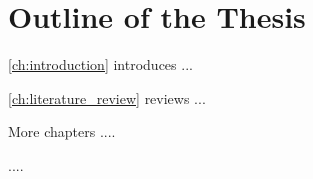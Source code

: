 \section{Outline of the Thesis}

\cref{ch:introduction} introduces ...

\cref{ch:literature_review} reviews ...



More chapters ....


....

